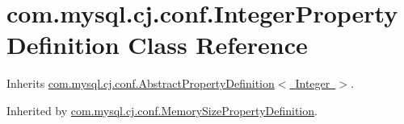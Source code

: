 \hypertarget{classcom_1_1mysql_1_1cj_1_1conf_1_1_integer_property_definition}{}\section{com.\+mysql.\+cj.\+conf.\+Integer\+Property\+Definition Class Reference}
\label{classcom_1_1mysql_1_1cj_1_1conf_1_1_integer_property_definition}


Inherits \mbox{\hyperlink{classcom_1_1mysql_1_1cj_1_1conf_1_1_abstract_property_definition}{com.\+mysql.\+cj.\+conf.\+Abstract\+Property\+Definition$<$ Integer $>$}}.



Inherited by \mbox{\hyperlink{classcom_1_1mysql_1_1cj_1_1conf_1_1_memory_size_property_definition}{com.\+mysql.\+cj.\+conf.\+Memory\+Size\+Property\+Definition}}.

